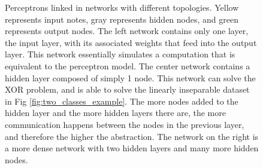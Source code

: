 \begin{figure}[!h]
\begin{subfigure}{0.30\linewidth}
  \end{subfigure}  
  \begin{subfigure}{0.40\linewidth}
    \centering
  \end{subfigure}
  \caption{Perceptrons linked in networks with different topologies. Yellow represents input notes, gray represents hidden nodes, and green represents output nodes. The left network contains only one layer, the input layer, with its associated weights that feed into the output layer. This network essentially simulates a computation that is equivalent to the perceptron model. The center network contains a hidden layer composed of simply 1 node. This network can solve the XOR problem, and is able to solve the linearly inseparable dataset in Fig \ref{fig:two_classes_example}. The more nodes added to the hidden layer and the more hidden layers there are, the more communication happens between the nodes in the previous layer, and therefore the higher the abstraction. The network on the right is a more dense network with two hidden layers and many more hidden nodes.}
  \label{fig:perceptron_layers_example}
\end{figure}

